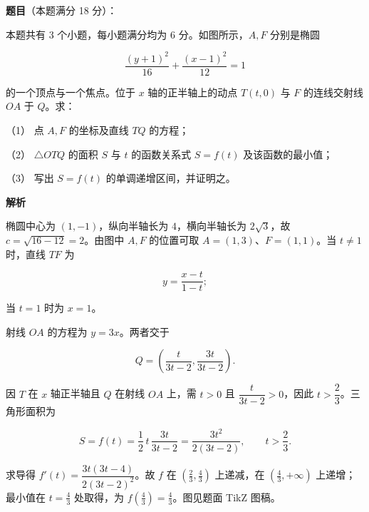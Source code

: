 \begin{answer}

\textbf{题目}（本题满分 18 分）：

本题共有 3 个小题，每小题满分均为 6 分。如图所示，$A,F$ 分别是椭圆

\nopagebreak[4]
\[
\frac{(y+1)^2}{16}+\frac{(x-1)^2}{12}=1
\]

的一个顶点与一个焦点。位于 $x$ 轴的正半轴上的动点 $T(t,0)$ 与 $F$ 的连线交射线 $OA$ 于 $Q$。求：
\nopagebreak[4]
\begin{center}\end{center}
\nopagebreak[4]
（1） 点 $A,F$ 的坐标及直线 $TQ$ 的方程；

（2） $\triangle OTQ$ 的面积 $S$ 与 $t$ 的函数关系式 $S=f(t)$ 及该函数的最小值；

（3） 写出 $S=f(t)$ 的单调递增区间，并证明之。

\textbf{解析}


椭圆中心为 $(1,-1)$，纵向半轴长为 $4$，横向半轴长为 $2\sqrt3$，故 $c=\sqrt{16-12}=2$。由图中 $A,F$ 的位置可取 $A=(1,3)$、$F=(1,1)$。当 $t\ne1$ 时，直线 $TF$ 为

\nopagebreak[4]
\[
y=\frac{x-t}{1-t};
\]

当 $t=1$ 时为 $x=1$。


射线 $OA$ 的方程为 $y=3x$。两者交于

\nopagebreak[4]
\[
Q=\left(\frac{t}{3t-2},\frac{3t}{3t-2}\right).
\]

因 $T$ 在 $x$ 轴正半轴且 $Q$ 在射线 $OA$ 上，需 $t>0$ 且 $\dfrac{t}{3t-2}>0$，因此 $t>\dfrac23$。三角形面积为

\nopagebreak[4]
\[
S=f(t)=\frac12\,t\,\frac{3t}{3t-2}=\frac{3t^2}{2(3t-2)},\qquad t>\frac23.
\]


求导得 $f'(t)=\dfrac{3t(3t-4)}{2(3t-2)^2}$。故 $f$ 在 $(\frac23,\frac43)$ 上递减，在 $(\frac43,+\infty)$ 上递增；最小值在 $t=\frac43$ 处取得，为 $f(\frac43)=\frac43$。图见题面 TikZ 图稿。




\end{answer}